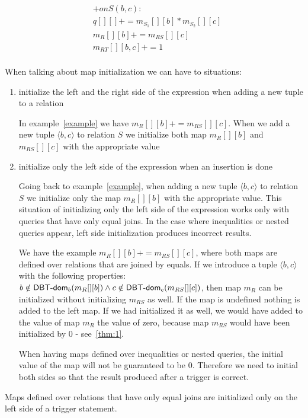 \documentclass[12pt]{article}
\begin{document}
\begin{align}
\label{example}
&+onS(b,c):\\\nonumber
&q[][]+=m_{S_1}[][b]*m_{S_2}[][c]\\\nonumber
&m_R[][b]+=m_{RS}[][c]\\\nonumber
&m_{RT}[][b,c]+=1\\\nonumber
\end{align}

When talking about map initialization we can have to situations:
\begin{enumerate}
\item initialize the left and the right side of the expression when adding a new tuple to a relation

In example~\ref{example} we have $m_R[][b]+=m_{RS}[][c]$. When we add a new tuple $\langle b,c\rangle$ to relation $S$ we initialize both map $m_R[][b]$ and $m_{RS}[][c]$ with the appropriate value

\item initialize only the left side of the expression when an insertion is done

Going back to example~\ref{example}, when adding a new tuple $\langle b,c\rangle$ to relation $S$ we initialize only the map $m_R[][b]$ with the appropriate value. This situation of initializing only the left side of the expression works only with queries that have only equal joins. In the case where inequalities or nested queries appear, left side initialization produces incorrect results.

We have the example $m_R[][b]+=m_{RS}[][c]$, where both maps are defined over relations that are joined by equals. If we introduce a tuple $\langle b,c\rangle$ with the following properties: $b\notin\textsf{DBT-dom}{}_{b}(m_R[][b])\land c\notin\textsf{DBT-dom}{}_{c}(m_{RS}[][c])$, then map $m_{R}$ can be initialized without initializing $m_{RS}$ as well. If the map is undefined nothing is added to the left map. If we had initialized it as well, we would have added to the value of map $m_{R}$ the value of zero, because map $m_{RS}$ would have been initialized by 0 - see~\ref{thm:1}.

When having maps defined over inequalities or nested queries, the initial value of the map will not be guaranteed to be 0. Therefore we need to initial both sides so that the result produced after a trigger is correct.
\end{enumerate}

\begin{theorem}
Maps defined over relations that have only equal joins are initialized only on the left side of a trigger statement. 
\end{theorem}
\end{document}
